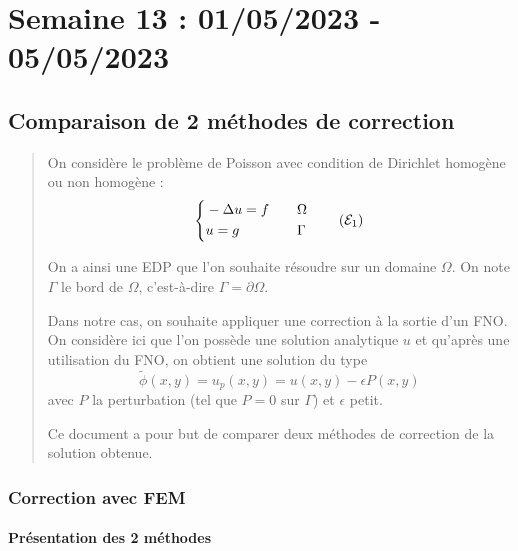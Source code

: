 \section{Semaine 13 : 01/05/2023 - 05/05/2023}
\graphicspath{{semaines/semaine_13/images/}}

\setcounter{equation}{0}
\setlength\parindent{0pt}

\subsection{Comparaison de 2 méthodes de correction \faBookmarkO}

\begin{abstract}
	On considère le problème de Poisson avec condition de Dirichlet homogène ou non homogène :
	\begin{equation}
		\label{pb1}
		\left\{\begin{aligned}
			&-\Delta u=f \quad &&\Omega \\
			&u=g \quad &&\Gamma
		\end{aligned}\right. \tag{$\mathcal{E}_1$}
	\end{equation}
	
	On a ainsi une EDP que l'on souhaite résoudre sur un domaine $\Omega$. On note $\Gamma$ le bord de $\Omega$, c'est-à-dire $\Gamma=\partial\Omega$. 
	
	Dans notre cas, on souhaite appliquer une correction à la sortie d'un FNO.
	On considère ici que l'on possède une solution analytique $u$ et qu'après une utilisation du FNO, on obtient une solution du type
	\begin{equation*}
		\label{phi_tild}
		\tilde{\phi}(x,y)=u_p(x,y) = u(x,y)-\epsilon P(x,y)
	\end{equation*}
	avec $P$ la perturbation (tel que $P=0$ sur $\Gamma$) et $\epsilon$ petit.
	
	Ce document a pour but de comparer deux méthodes de correction de la solution obtenue.
\end{abstract}

\subsubsection{Correction avec FEM}

\paragraph{Présentation des 2 méthodes}

